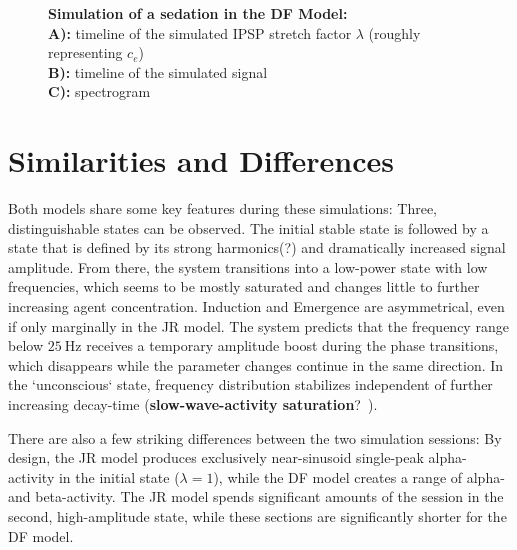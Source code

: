 \begin{figure}[H]

\caption{\textbf{Simulation of a sedation in the DF Model:} \\
        \textbf{A):} timeline of the simulated IPSP stretch factor $\lambda$ (roughly representing $c_e$) \\
        \textbf{B):} timeline of the simulated signal \\
        \textbf{C):} spectrogram
}\label{fig:sedation_sim_df}
\end{figure}

\section{Similarities and Differences}
    Both models share some key features during these simulations:
    Three, distinguishable states can be observed. 
    The initial stable state is followed by a state that is defined by its strong harmonics(?) and dramatically increased
    signal amplitude.
    From there, the system transitions into a low-power state with low frequencies,
    which seems to be mostly saturated and changes little to further increasing agent concentration.
    Induction and Emergence are asymmetrical, even if only marginally in the JR model.
    The system predicts that the frequency range below $\SI{25}{\hertz}$ receives a temporary amplitude boost during
    the phase transitions, which disappears while the parameter changes continue in the same direction.
    In the `unconscious` state, frequency distribution stabilizes independent of further increasing decay-time
    (\textbf{slow-wave-activity saturation}?~\cite{ni_mhuircheartaigh_slow_wave_2013}).

There are also a few striking differences between the two simulation sessions:
By design,
the JR model produces exclusively near-sinusoid single-peak alpha-activity in the initial state ($\lambda = 1$),
while the DF model creates a range of alpha- and beta-activity.
The JR model spends significant amounts of the session in the second, high-amplitude state,
while these sections are significantly shorter for the DF model.





